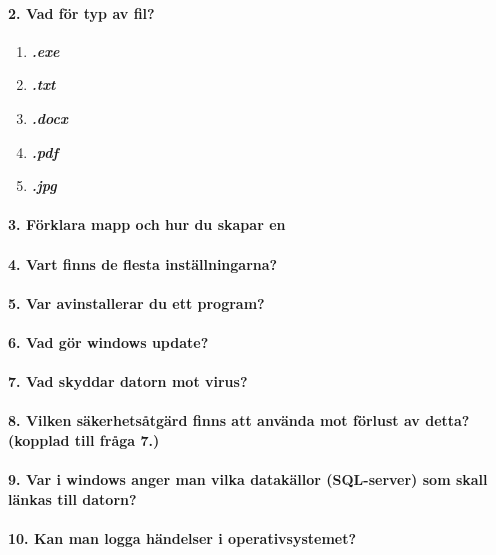\paragraph{2. Vad för typ av fil?}
\begin{enumerate}
	\item \textbf{\textit{.exe}}
	\item \textbf{\textit{.txt}}
	\item \textbf{\textit{.docx}}
	\item \textbf{\textit{.pdf}}
	\item \textbf{\textit{.jpg}}
\end{enumerate}

\paragraph{3. Förklara mapp och hur du skapar en}

\paragraph{4. Vart finns de flesta inställningarna?}

\paragraph{5. Var avinstallerar du ett program?}

\paragraph{6. Vad gör windows update?}

\paragraph{7. Vad skyddar datorn mot virus?}

\paragraph{8. Vilken säkerhetsåtgärd finns att använda mot förlust av detta? (kopplad till fråga 7.)}

\paragraph{9. Var i windows anger man vilka datakällor (SQL-server) som skall länkas till datorn?}

\paragraph{10. Kan man logga händelser i operativsystemet?}

